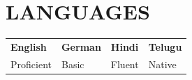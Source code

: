 \documentclass[a4paper,11pt]{article}
\begin{document}
\section*{LANGUAGES}
\begin{tabularx}{\textwidth}{@{}XXXX@{}}
  \textbf{English} & \textbf{German} & \textbf{Hindi} & \textbf{Telugu} \\
  Proficient & Basic & Fluent & Native \\
\end{tabularx}

\vfill
\end{document}
